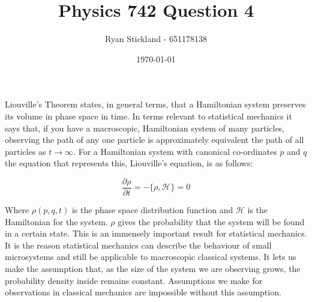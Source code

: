 \documentclass[11pt]{article}
\title{Physics 742 Question 4}
\author{Ryan Stickland - 651178138}
\date{\today}
\begin{document}
\maketitle

Liouville's Theorem states, in general terms, that a Hamiltonian system preserves its volume in phase space in time. In terms relevant to statistical mechanics it says that, if you have a macroscopic, Hamiltonian system of many particles, observing the path of any one particle is approximately equivalent the path of all particles as $t\to\infty$. For a Hamiltonian system with canonical co-ordinates $p$ and $q$ the equation that represents this, Liouville’s equation, is as follows:

$$\frac{\partial\rho}{\partial t}=-\{\rho,\mathcal{H}\}=0$$

Where $\rho(p,q,t)$ is the phase space distribution function and $\mathcal{H}$ is the Hamiltonian for the system. $\rho$ gives the probability that the system will be found in a certain state. This is an immensely important result for statistical mechanics. It is the reason statistical mechanics can describe the behaviour of small microsystems and still be applicable to macroscopic classical systems. It lets us make the assumption that, as the size of the system we are observing grows, the probability density inside remains constant. Assumptions we make for observations in classical mechanics are impossible without this assumption.
\end{document}
